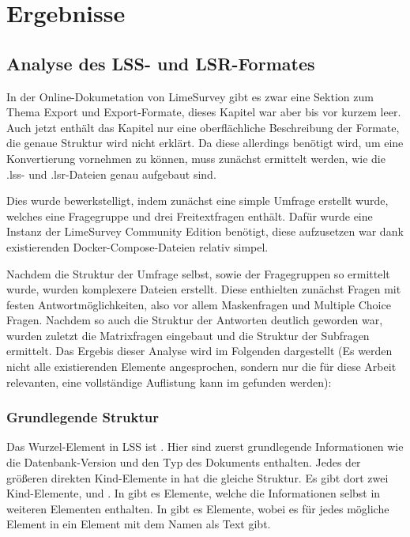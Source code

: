 \chapter{Ergebnisse}
\label{ch:ergebnisse}

\section{Analyse des LSS- und LSR-Formates}

In der Online-Dokumetation von LimeSurvey gibt es zwar eine Sektion zum Thema Export und Export-Formate, dieses Kapitel war aber bis vor kurzem leer.
Auch jetzt enthält das Kapitel nur eine oberflächliche Beschreibung der Formate, die genaue Struktur wird nicht erklärt.
Da diese allerdings benötigt wird, um eine Konvertierung vornehmen zu können, muss zunächst ermittelt werden, wie die .lss- und .lsr-Dateien genau aufgebaut sind.

Dies wurde bewerkstelligt, indem zunächst eine simple Umfrage erstellt wurde, welches eine Fragegruppe und drei Freitextfragen enthält.
Dafür wurde eine Instanz der LimeSurvey Community Edition benötigt, diese aufzusetzen war dank existierenden Docker-Compose-Dateien relativ simpel.

Nachdem die Struktur der Umfrage selbst, sowie der Fragegruppen so ermittelt wurde, wurden komplexere Dateien erstellt.
Diese enthielten zunächst Fragen mit festen Antwortmöglichkeiten, also vor allem Maskenfragen und Multiple Choice Fragen.
Nachdem so auch die Struktur der Antworten deutlich geworden war, wurden zuletzt die Matrixfragen eingebaut und die Struktur der Subfragen ermittelt.
Das Ergebis dieser Analyse wird im Folgenden dargestellt (Es werden nicht alle existierenden Elemente angesprochen, sondern nur die für diese Arbeit relevanten, eine vollständige Auflistung kann im %
gefunden werden):

\subsection{Grundlegende Struktur}

Das Wurzel-Element in LSS ist .
Hier sind zuerst grundlegende Informationen wie die Datenbank-Version und den Typ des Dokuments enthalten.
Jedes der größeren direkten Kind-Elemente in  hat die gleiche Struktur.
Es gibt dort zwei Kind-Elemente,  und . In  gibt es  Elemente, welche die Informationen selbst in weiteren Elementen enthalten.
In  gibt es  Elemente, wobei es für jedes mögliche Element in  ein  Element mit dem Namen als Text gibt.

